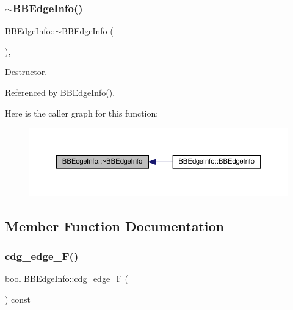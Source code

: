 \subsubsection{\texorpdfstring{$\sim$\+B\+B\+Edge\+Info()}{~BBEdgeInfo()}}
{\footnotesize\ttfamily B\+B\+Edge\+Info\+::$\sim$\+B\+B\+Edge\+Info (\begin{DoxyParamCaption}{ }\end{DoxyParamCaption})\hspace{0.3cm}{\ttfamily [override]}, {\ttfamily [default]}}



Destructor. 



Referenced by B\+B\+Edge\+Info().

Here is the caller graph for this function\+:
\nopagebreak
\begin{figure}[H]
\begin{center}
\leavevmode
\includegraphics[width=350pt]{d7/d8b/structBBEdgeInfo_af00fe7eb7e1e14162b3d288dc97e3489_icgraph}
\end{center}
\end{figure}


\subsection{Member Function Documentation}
\mbox{\label{structBBEdgeInfo_aa4a8bccec517f12229e14867314b2cf6}} 
\subsubsection{\texorpdfstring{cdg\+\_\+edge\+\_\+\+F()}{cdg\_edge\_F()}}
{\footnotesize\ttfamily bool B\+B\+Edge\+Info\+::cdg\+\_\+edge\+\_\+F (\begin{DoxyParamCaption}{ }\end{DoxyParamCaption}) const}



